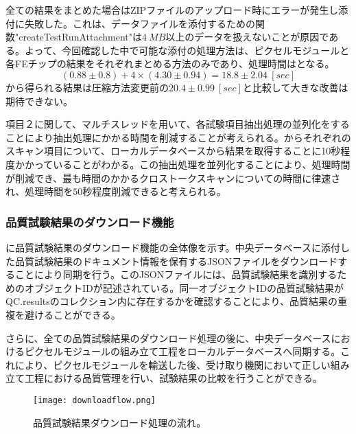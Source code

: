 全ての結果をまとめた場合はZIPファイルのアップロード時にエラーが発生し添付に失敗した。これは、データファイルを添付するための関数"createTestRunAttachment"は$4\ \si{MB}$以上のデータを扱えないことが原因である。よって、今回確認した中で可能な添付の処理方法は、ピクセルモジュールと各FEチップの結果をそれぞれまとめる方法のみであり、処理時間はとなる。
\begin{equation}
  \label{eq:asshuku}
  (0.88 \pm 0.8) + 4\times(4.30 \pm 0.94) = 18.8 \pm 2.04\ [\si{sec}]
\end{equation}
から得られる結果は圧縮方法変更前の$20.4 \pm 0.99\ [\si{sec}]$と比較して大きな改善は期待できない。

項目２に関して、マルチスレッドを用いて、各試験項目抽出処理の並列化をすることにより抽出処理にかかる時間を削減することが考えられる。からそれぞれのスキャン項目について、ローカルデータベースから結果を取得することに10秒程度かかっていることがわかる。この抽出処理を並列化することにより、処理時間が削減でき、最も時間のかかるクロストークスキャンについての時間に律速され、処理時間を$50$秒程度削減できると考えられる。


\subsubsection{品質試験結果のダウンロード機能}


に品質試験結果のダウンロード機能の全体像を示す。中央データベースに添付した品質試験結果のドキュメント情報を保有するJSONファイルをダウンロードすることにより同期を行う。このJSONファイルには、品質試験結果を識別するためのオブジェクトIDが記述されている。同一オブジェクトIDの品質試験結果がQC.resultsのコレクション内に存在するかを確認することにより、品質結果の重複を避けることができる。

さらに、全ての品質試験結果のダウンロード処理の後に、中央データベースにおけるピクセルモジュールの組み立て工程をローカルデータベースへ同期する。これにより、ピクセルモジュールを輸送した後、受け取り機関において正しい組み立て工程における品質管理を行い、試験結果の比較を行うことができる。

\begin{figure}[tbp]
  \centering
  \texttt{[image: downloadflow.png]}
  \caption[品質試験結果ダウンロード処理の流れ]{品質試験結果ダウンロード処理の流れ。}
  \label{fig:downloadresults}
\end{figure}




